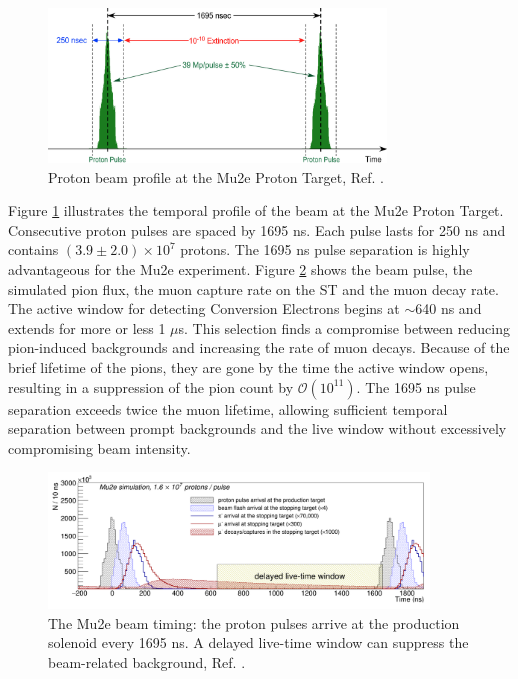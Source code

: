 \begin{figure}[!h]
\centering
\includegraphics[width =0.8\textwidth]{figures/png/Screenshot_20240301_151148.png}
\caption[Proton beam profile.]{Proton beam profile at the Mu2e Proton Target, Ref. \cite{accelerator}.}
\label{fig:beamprofile}
\end{figure}
Figure \ref{fig:beamprofile} illustrates the temporal profile of the beam at the Mu2e Proton Target. Consecutive proton pulses are spaced by 1695 ns. Each pulse lasts for 250 ns and contains $(3.9 \pm 2.0 )\times 10^7$ protons. The 1695 ns pulse separation is highly advantageous for the Mu2e experiment. Figure \ref{fig:beamwindow} shows the beam pulse, 
the simulated pion flux, the muon capture rate on the ST and the muon decay rate. The active window for detecting Conversion Electrons begins at $\sim$640 ns and extends for more or less 1 $\mu$s. This selection finds a compromise between reducing pion-induced backgrounds  and increasing the rate of muon decays. Because of the brief lifetime of the pions, they are gone by the time the active window opens, resulting in a suppression of the pion count by $\mathcal{O}(10^{11})$. The 1695 ns pulse separation exceeds twice the muon lifetime, allowing sufficient temporal separation between prompt backgrounds and the live window without excessively compromising beam intensity.
\begin{figure}[!h]
\centering
\includegraphics[width =0.9\textwidth]{figures/png/Screenshot_20240301_164649.png}
\caption[The Mu2e beam timing]{The Mu2e beam timing: the proton pulses arrive at the production solenoid every 1695 ns. A delayed live-time window can suppress the beam-related background, Ref. \cite{universe9010054}.}
\label{fig:beamwindow}
\end{figure}
